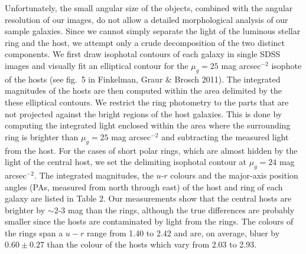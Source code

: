 \documentclass[useAMS,usenatbib]{mn2e}
\begin{document}
Unfortunately, the small angular size of the objects, combined with the angular resolution of our images, do not allow a detailed morphological analysis of our sample galaxies.
Since we cannot simply separate the light of the luminous stellar ring and the host, we attempt only a crude decomposition of the two distinct components. 
We first draw isophotal contours of each galaxy in single SDSS images and visually fit an elliptical contour for the $\mu_g =25$ mag arcsec$^{−2}$ isophote of the hosts (see fig.\ 5 in Finkelman, Graur \& Brosch 2011). The integrated magnitudes of the hosts are then computed within the area delimited by the these elliptical contours.
We restrict the ring photometry to the parts that are not projected against the bright regions of the host galaxies.
This is done by computing the integrated light enclosed within the area where the surrounding ring is brighter than $\mu_g =25$ mag arcsec$^{−2}$ and subtracting the measured light from the host.
For the cases of short polar rings, which are almost hidden by the light of the central host, we set the delimiting isophotal contour at $\mu_g =24$ mag arcsec$^{−2}$. 
The integrated magnitudes, the $u$-$r$ colours and the major-axis position angles (PAs, measured from north through east) of the host and ring of each galaxy are listed in Table 2.
Our measurements show that the central hosts are brighter by $\sim$2-3 mag than the rings, although the true differences are probably smaller since the hosts are contaminated by light from the rings. 
The colours of the rings span a $u-r$ range from 1.40 to 2.42 and are, on average, bluer by $0.60\pm0.27$ than the colour of the hosts which vary from 2.03 to 2.93.  
\end{document}

